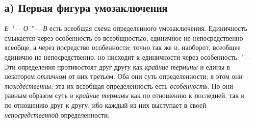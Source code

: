 \subsection[а) Первая фигура умозаключения]{а) Первая фигура умозаключения}
{\em Е "--- О "--- В}
есть всеобщая схема определенного умозаключения. Единичность
смыкается через особенность со всеобщностью; единичное не непосредственно
всеобще, а через посредство особенности; точно так же и, наоборот, всеобщее
единично не непосредственно, но нисходит к единичности через особенность.
"--- Эти определения противостоят друг другу как
{\em крайние термины} и
едины в некотором {\em отличном}
от них третьем. Оба они суть определенности; в этом они
{\em тождественны;} эта
их всеобщая определенность есть
{\em особенность}. Но они
равным образом суть и {\em крайние
термины} как по отношению к последней, так и по отношению
друг к другу, ибо каждый из них выступает в своей
{\em непосредственной}
определенности.

